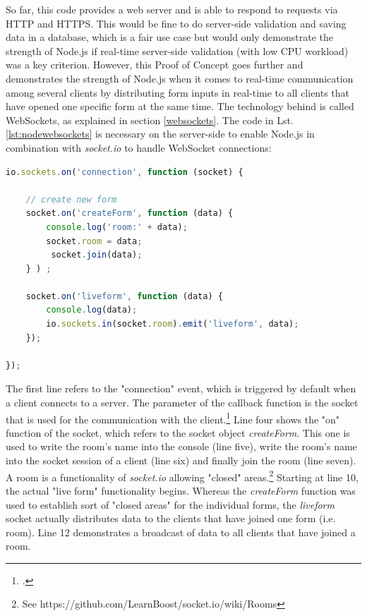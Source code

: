 So far, this code provides a web server and is able to respond to requests via HTTP and HTTPS. This would be fine to do server-side validation and saving data in a database, which is a fair use case but would only demonstrate the strength of Node.js if real-time server-side validation (with low CPU workload) was a key criterion. However, this Proof of Concept goes further and demonstrates the strength of Node.js when it comes to real-time communication among several clients by distributing form inputs in real-time to all clients that have opened one specific form at the same time. The technology behind is called WebSockets, as explained in section \ref{websockets}. The code in Lst.  \ref{lst:nodewebsockets} is necessary on the server-side to enable Node.js in combination with \textit{socket.io} to handle WebSocket connections:

\begin{lstlisting}[float,
language=javascript,
caption={Using WebSockets to distribute form inputs in real-time},
label=lst:nodewebsockets]
io.sockets.on('connection', function (socket) {

    // create new form
    socket.on('createForm', function (data) {
        console.log('room:' + data);
        socket.room = data;
         socket.join(data);
    } ) ;

    socket.on('liveform', function (data) {
        console.log(data);
        io.sockets.in(socket.room).emit('liveform', data);
    });

});
\end{lstlisting}

The first line refers to the "connection" event, which is triggered by default when a client connects to a server. The parameter of the callback function is the socket that is used for the communication with the client.\footcite[Cf.][197]{Roden_2012} Line four shows the "on" function of the socket, which refers to the socket object \textit{createForm}. This one is used to write the room's name into the console (line five), write the room's name into the socket session of a client (line six) and finally join the room (line seven). A room is a functionality of \textit{socket.io} allowing "closed" areas.\footnote{See https://github.com/LearnBoost/socket.io/wiki/Rooms} Starting at line 10, the actual "live form" functionality begins. Whereas the \textit{createForm} function was used to establish sort of "closed areas" for the individual forms, the \textit{liveform} socket actually distributes data to the clients that have joined one form (i.e. room). Line 12 demonstrates a broadcast of data to all clients that have joined a room.

